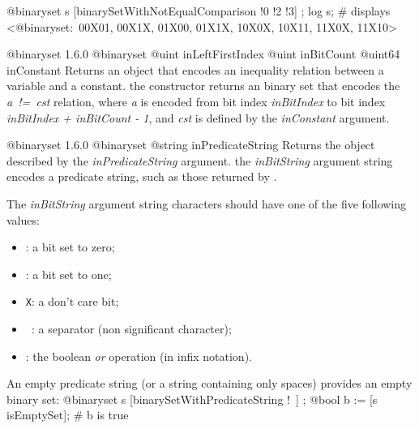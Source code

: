 \exempleDeuxLignes
{}
{@binaryset s [binarySetWithNotEqualComparison !0 !2 !3] ;}
{log s; \# displays <@binaryset:~00X01, 00X1X, 01X00, 01X1X, 10X0X, 10X11, 11X0X, 11X10>}





{@binaryset}
{1.6.0}
{@binaryset}
{@uint inLeftFirstIndex}
{@uint inBitCount}
{@uint64 inConstant}
{Returns an  object that encodes an inequality relation between a variable and a constant.}
{the constructor returns an binary set that encodes the \emph{a~!=~cst} relation, where \emph {a} is encoded from bit index \emph{inBitIndex} to bit index \emph{inBitIndex  + inBitCount - 1}, and \emph{cst} is defined by the \emph{inConstant} argument.}







{@binaryset}
{1.6.0}
{@binaryset}
{@string inPredicateString}
{Returns the  object described by the \emph{inPredicateString} argument.}
{the \emph{inBitString} argument string encodes a predicate string, such as those returned by .}
\begin{description}
\item The \emph{inBitString} argument string characters should have one of the five following values:
\begin{itemize}
\item \texttt{\textquotesingle}: a bit set to zero;
\item \texttt{\textquotesingle}: a bit set to one;
\item \texttt{\textquotesingle X\textquotesingle}: a don't care bit;
\item \texttt{\textquotesingle~\textquotesingle}: a separator (non significant character);
\item \texttt{\textquotesingle\textbar\textquotesingle}: the boolean \emph{or} operation (in infix notation).
\end{itemize}
\end{description}


\exempleDeuxLignes
{An empty predicate string (or a string containing only spaces) provides an empty binary set:}
{@binaryset s [binarySetWithPredicateString !\textquotedbl~\textquotedbl] ;}
{@bool b := [s isEmptySet]; \# b is true}


